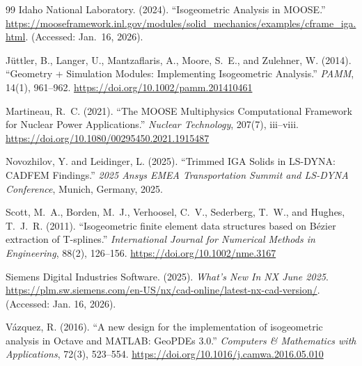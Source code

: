 \documentclass[12pt,report,justified]{SANDreport}
\begin{document}
\begin{thebibliography}{99}
{Idaho National Laboratory}. (2024).
``Isogeometric {A}nalysis in {MOOSE}.''
\url{https://mooseframework.inl.gov/modules/solid_mechanics/examples/cframe_iga.html}.
(Accessed: Jan.\ 16, 2026).

J{\"u}ttler, B., Langer, U., Mantzaflaris, A., Moore, S.~E., and Zulehner, W. (2014).
``Geometry + {S}imulation {M}odules: {I}mplementing {I}sogeometric {A}nalysis.''
\emph{PAMM}, 14(1), 961--962.
\url{https://doi.org/10.1002/pamm.201410461}

Martineau, R.~C. (2021).
``The {MOOSE} {M}ultiphysics {C}omputational {F}ramework for {N}uclear {P}ower {A}pplications.''
\emph{Nuclear Technology}, 207(7), iii--viii.
\url{https://doi.org/10.1080/00295450.2021.1915487}

Novozhilov, Y. and Leidinger, L. (2025).  ``Trimmed IGA Solids in LS-DYNA: CADFEM Findings.'' \emph{2025 Ansys EMEA Transportation Summit and LS-DYNA Conference}, Munich, Germany, 2025.

Scott, M.~A., Borden, M.~J., Verhoosel, C.~V., Sederberg, T.~W., and Hughes, T.~J.~R. (2011).
``Isogeometric finite element data structures based on {B\'{e}zier} extraction of {T}-splines.''
\emph{International Journal for Numerical Methods in Engineering}, 88(2), 126--156.
\url{https://doi.org/10.1002/nme.3167}

Siemens Digital Industries Software. (2025). \emph{What's New In NX June 2025}. \url{https://plm.sw.siemens.com/en-US/nx/cad-online/latest-nx-cad-version/}. (Accessed: Jan. 16, 2026).

V{\'a}zquez, R. (2016).
``A new design for the implementation of isogeometric analysis in {O}ctave and {MATLAB}: {GeoPDEs} 3.0.''
\emph{Computers \& Mathematics with Applications}, 72(3), 523--554.
\url{https://doi.org/10.1016/j.camwa.2016.05.010}

\end{thebibliography}
\end{document}
